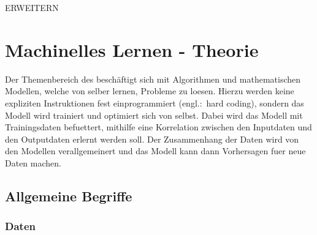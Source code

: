 \documentclass[../main]{subfiles}
\begin{document}
ERWEITERN


\pagebreak
\section{Machinelles Lernen - Theorie}

Der Themenbereich des  beschäftigt sich mit Algorithmen und mathematischen Modellen, welche von selber lernen, Probleme zu loesen.
Hierzu werden keine expliziten Instruktionen fest einprogrammiert (engl.:\ hard coding), sondern das Modell wird trainiert und optimiert sich von selbst.
Dabei wird das Modell mit Trainingsdaten befuettert, mithilfe eine Korrelation zwischen den Inputdaten und den Outputdaten erlernt werden soll.
Der Zusammenhang der Daten wird von den Modellen verallgemeinert und das Modell kann dann Vorhersagen fuer neue Daten machen.

\subsection{Allgemeine Begriffe}

\subsubsection{Daten}
\end{document}
